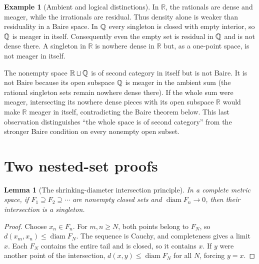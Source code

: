 \documentclass[11pt,oneside,openany]{book}
\newtheorem{lemma}[theorem]{Lemma}
\theoremstyle{definition}
\newtheorem{example}[theorem]{Example}
\theoremstyle{remark}
\newcommand{\R}{\mathbb R}\newcommand{\C}{\mathbb C}
\DeclareMathOperator{\diam}{diam}
\begin{document}
\begin{example}[Ambient and logical distinctions]\label{d10:14:category-boundaries}
In $\R$, the rationals are dense and meager, while the irrationals are residual. Thus density alone is weaker than residuality in a Baire space. In $\mathbb Q$ every singleton is closed with empty interior, so $\mathbb Q$ is meager in itself. Consequently even the empty set is residual in $\mathbb Q$ and is not dense there. A singleton in $\R$ is nowhere dense in $\R$ but, as a one-point space, is not meager in itself.

The nonempty space $\R\sqcup\Q$ is of second category in itself but is not Baire. It is not Baire because its open subspace $\mathbb Q$ is meager in the ambient sum (the rational singleton sets remain nowhere dense there). If the whole sum were meager, intersecting its nowhere dense pieces with its open subspace $\R$ would make $\R$ meager in itself, contradicting the Baire theorem below. This last observation distinguishes ``the whole space is of second category'' from the stronger Baire condition on every nonempty open subset.
\end{example}

\section{Two nested-set proofs}

\begin{lemma}[The shrinking-diameter intersection principle]\label{d10:14:nested-closed}
In a complete metric space, if $F_1\supseteq F_2\supseteq\cdots$ are nonempty closed sets and $\diam F_n\to0$, then their intersection is a singleton.
\end{lemma}
\begin{proof}
Choose $x_n\in F_n$. For $m,n\geq N$, both points belong to $F_N$, so $d(x_m,x_n)\leq\diam F_N$. The sequence is Cauchy, and completeness gives a limit $x$. Each $F_N$ contains the entire tail and is closed, so it contains $x$. If $y$ were another point of the intersection, $d(x,y)\leq\diam F_N$ for all $N$, forcing $y=x$.
\end{proof}
\end{document}
